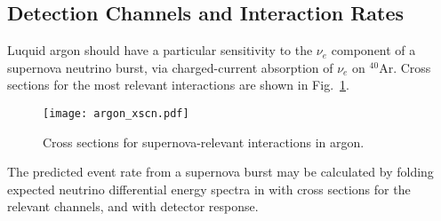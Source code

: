 \subsection{Detection Channels and Interaction Rates}

Luquid argon should have a particular sensitivity to the $\nu_e$
component of a supernova neutrino burst, via charged-current
absorption of $\nu_e$ on $^{40}$Ar.  Cross sections for the most
relevant interactions are shown in Fig.~\ref{fig:xscns}.

\begin{figure}[!htb]
\centering
\texttt{[image: argon\_xscn.pdf]}
\caption[]{Cross sections for supernova-relevant interactions in argon.}
\label{fig:xscns}
\end{figure}
%
The predicted event rate from a supernova burst may be calculated by
folding expected neutrino differential energy spectra in with cross
sections for the relevant channels, and with detector response.
%


